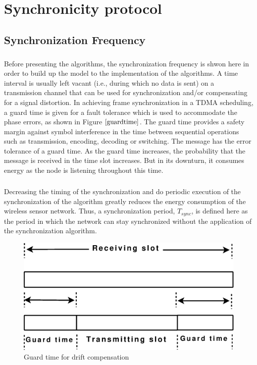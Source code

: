 \documentclass[a4paper,10pt]{report}
\begin{document}
\chapter{\textbf{Synchronicity protocol}}
\section{\textbf{Synchronization Frequency}}\paragraph*{}
Before presenting the algorithms, the synchronization frequency is shwon here in order to build up the model to the implementation of the algorithms. A time interval is usually left vacant (i.e., during which no data is sent) on a transmission channel that can be used for synchronization and/or compensating for a signal distortion. In achieving frame synchronization in a TDMA scheduling, a guard time is given for a fault tolerance which is used to accommodate the phase errors, as shown in Figure $\ref{guardtime}$. The guard time provides a safety margin against symbol interference in the time between sequential operations such as transmission, encoding, decoding or switching. The message has the error tolerance of a guard time. As the guard time increases, the probability that the message is received in the time slot increases. But in its downturn, it consumes energy as the node is listening throughout this time.
\paragraph*{} Decreasing the timing of the synchronization and do periodic execution of the synchronization of the algorithm greatly reduces
the energy consumption of the wireless sensor network. Thus, a synchronization period, $T_{sync}$, is defined here as the period in which the network can stay synchronized without the application of the synchronization algorithm.
\begin{figure}
\centering
\includegraphics[width=0.6 \textwidth]{guardtime}
\caption{Guard time for drift compensation} \label{guardtime}
\end{figure}
\end{document}
